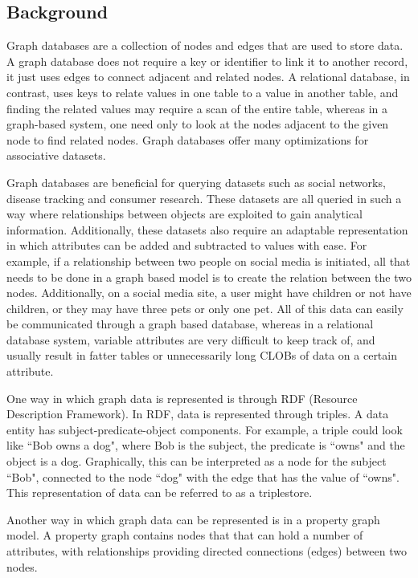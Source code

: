 \subsection*{Background}


Graph databases are a collection of nodes and edges that are used to store data. A graph database does not require a key or identifier to link it to another record, it just uses edges to connect adjacent and related nodes. A relational database, in contrast, uses keys to relate values in one table to a value in another table, and finding the related values may require a scan of the entire table, whereas in a graph-based system, one need only to look at the nodes adjacent to the given node to find related nodes. Graph databases offer many optimizations for associative datasets.


Graph databases are beneficial for querying datasets such as social networks, disease tracking and consumer research. These datasets are all queried in such a way where relationships between objects are exploited to gain analytical information. Additionally, these datasets also require an adaptable representation in which attributes can be added and subtracted to values with ease. For example, if a relationship between two people on social media is initiated, all that needs to be done in a graph based model is to create the relation between the two nodes. Additionally, on a social media site, a user might have children or not have children, or they may have three pets or only one pet. All of this data can easily be communicated through a graph based database, whereas in a relational database system, variable attributes are very difficult to keep track of, and usually result in fatter tables or unnecessarily long CLOBs of data on a certain attribute.



One way in which graph data is represented is through RDF (Resource Description Framework). In RDF, data is represented through triples. A data entity has subject-predicate-object components\cite{RDF}.
For example, a triple could look like ``Bob owns a dog", where Bob is the subject, the predicate is ``owns" and the object is a dog.
Graphically, this can be interpreted as a node for the subject ``Bob", connected to the node ``dog" with the edge that has the value of ``owns". This representation of data can be referred to as a triplestore.


Another way in which graph data can be represented is in a property graph model. A property graph contains nodes that that can hold a number of attributes, with relationships providing directed connections (edges) between two nodes\cite{neoj4}.


